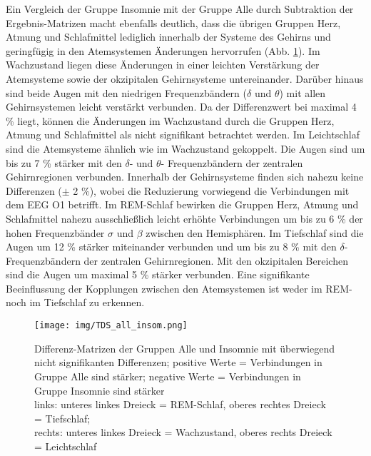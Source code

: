 Ein Vergleich der Gruppe Insomnie mit der Gruppe Alle durch Subtraktion der Ergebnis-Matrizen macht ebenfalls deutlich, dass die übrigen Gruppen Herz, Atmung und Schlafmittel lediglich innerhalb der Systeme des Gehirns und geringfügig in den Atemsystemen Änderungen hervorrufen (Abb. \ref{fig:TDSall_insom}). Im Wachzustand liegen diese Änderungen in einer leichten Verstärkung der Atemsysteme sowie der okzipitalen Gehirnsysteme untereinander. Darüber hinaus sind beide Augen mit den niedrigen Frequenzbändern ($\delta$ und $\theta$) mit allen Gehirnsystemen leicht verstärkt verbunden. Da der Differenzwert bei maximal 4 \% liegt, können die Änderungen im Wachzustand durch die Gruppen Herz, Atmung und Schlafmittel als nicht signifikant betrachtet werden. Im Leichtschlaf sind die Atemsysteme ähnlich wie im Wachzustand gekoppelt. Die Augen sind um bis zu 7 \% stärker mit den $\delta$- und $\theta$- Frequenzbändern der zentralen Gehirnregionen verbunden. Innerhalb der Gehirnsysteme finden sich nahezu keine Differenzen ($\pm$ 2 \%), wobei die Reduzierung vorwiegend die Verbindungen mit dem \acs{EEG} O1 betrifft. Im \acs{REM}-Schlaf bewirken die Gruppen Herz, Atmung und Schlafmittel nahezu ausschließlich leicht erhöhte Verbindungen um bis zu 6 \% der hohen Frequenzbänder $\sigma$ und $\beta$ zwischen den Hemisphären. Im Tiefschlaf sind die Augen um 12 \% stärker miteinander verbunden und um bis zu 8 \% mit den $\delta$-Frequenzbändern der zentralen Gehirnregionen. Mit den okzipitalen Bereichen sind die Augen um maximal 5 \% stärker verbunden. Eine signifikante Beeinflussung der Kopplungen zwischen den Atemsystemen ist weder im \acs{REM}- noch im Tiefschlaf zu erkennen.\\

\begin{figure}[H]
	\centering
	\texttt{[image: img/TDS\_all\_insom.png]}
	\caption[Differenzen zwischen Gruppe Alle und Insomnie]{Differenz-Matrizen der Gruppen Alle und Insomnie mit überwiegend nicht signifikanten Differenzen; positive Werte = Verbindungen in Gruppe Alle sind stärker; negative Werte = Verbindungen in Gruppe Insomnie sind stärker\\links: unteres linkes Dreieck = \acs{REM}-Schlaf, oberes rechtes Dreieck = Tiefschlaf;\\rechts: unteres linkes Dreieck = Wachzustand, oberes rechts Dreieck = Leichtschlaf}
	\label{fig:TDSall_insom}
\end{figure}

